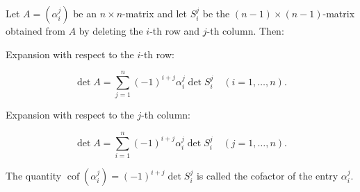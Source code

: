 Let $A = (\alpha_i^j)$ be an $n \times n$-matrix and let $S_i^j$ be the $(n-1) \times (n-1)$-matrix obtained from $A$ by deleting the $i$-th row and $j$-th column. Then:

Expansion with respect to the $i$-th row:

$$\det A = \sum_{j=1}^{n} (-1)^{i+j} \alpha_i^j \det S_i^j \quad (i = 1, \ldots, n).$$

Expansion with respect to the $j$-th column:

$$\det A = \sum_{i=1}^{n} (-1)^{i+j} \alpha_i^j \det S_i^j \quad (j = 1, \ldots, n).$$

The quantity $\operatorname{cof}(\alpha_i^j) = (-1)^{i+j} \det S_i^j$ is called the cofactor of the entry $\alpha_i^j$.
